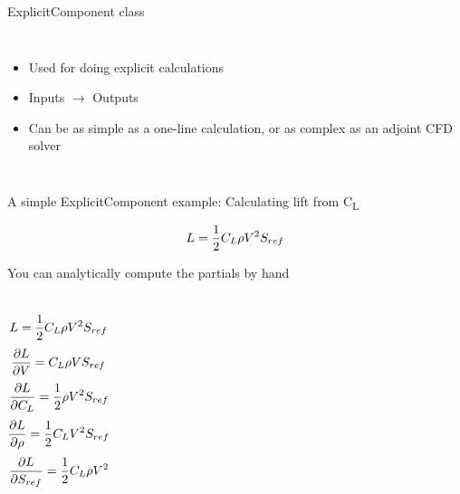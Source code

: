 \documentclass[aspectratio=169, usenames, dvipsnames, 14pt]{beamer}
\begin{document}
\begin{frame}{ExplicitComponent class}
    \begin{columns}[T]
  
            \begin{itemize}
                \item Used for doing explicit calculations
                \vspace{.5cm}
                \item Inputs $\rightarrow$ Outputs
                \vspace{.5cm}
                \item Can be as simple as a one-line calculation, or as complex as an adjoint CFD solver
            \end{itemize}

  \end{columns}
 
\end{frame}

\begin{frame}{A simple ExplicitComponent example: Calculating lift from C\textsubscript{L}}

		$$ \large L = \dfrac{1}{2} C_L \rho V^2 S_{ref} $$
	
\end{frame}

\begin{frame}{You can analytically compute the partials by hand}

	\begin{columns}
				$$ \large L = \frac{1}{2} C_L \rho V^2 S_{ref} $$
				$$ \small \dfrac{\partial L}{\partial V} = C_L \rho V S_{ref} $$ 
				$$ \small \dfrac{\partial L}{\partial C_L} = \dfrac{1}{2} \rho V^2 S_{ref} $$
				$$ \small \dfrac{\partial L}{\partial \rho} = \dfrac{1}{2} C_L V^2 S_{ref} $$
				$$ \small \dfrac{\partial L}{\partial S_{ref}} = \dfrac{1}{2} C_L \rho V^2 $$
	\end{columns}

\end{frame}
\end{document}
